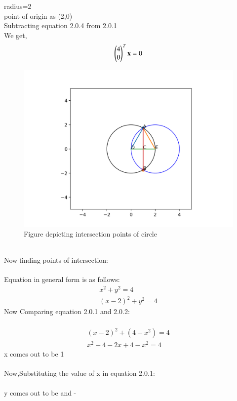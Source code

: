 \documentclass[journal,12pt,twocolumn]{IEEEtran}
\begin{document}
 radius=2\\
 point of origin as (2,0)\\
 Subtracting equation 2.0.4 from 2.0.1\\
 We get,
 \begin{align}
 \begin{pmatrix}4\\0\end{pmatrix}^T\mathbf{x}=0
 \end{align}
 \begin{figure}[h!]
	\centering
	\includegraphics[width=\columnwidth]{Assignment_5.png}
	\caption{Figure depicting intersection points of circle}
	\label{myfig}
\end{figure}
 \\
 Now finding points of intersection:\\
 \\
Equation in general form is as follows:\\
 \begin{align}
 x^{2}+y^{2}=4\\
 (x-2)^{2}+y^{2}=4
 \end{align}
 Now Comparing equation 2.0.1 and 2.0.2:\\
 \\
 \begin{align}
 (x-2)^{2}+(4-x^{2})=4\\
 x^2+4-2x+4-x^2=4
 \end{align}
 x comes out to be 1\\ \\
 Now,Substituting the value of x in equation 2.0.1:\\
 \\
 y comes out to be  and -\\ \\
\end{document}
